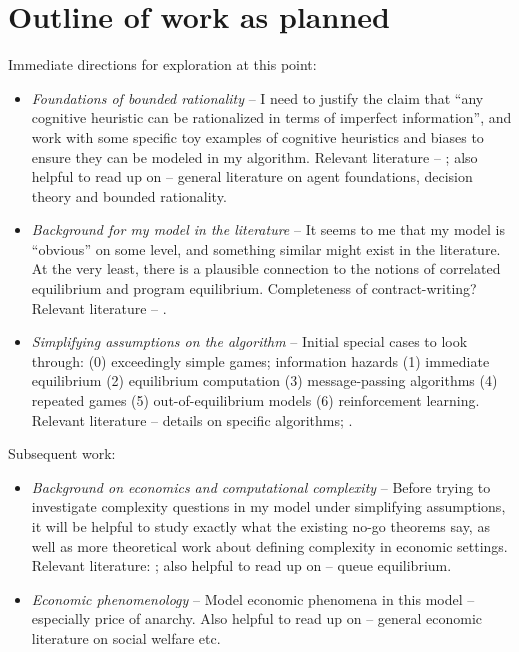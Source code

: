 \documentclass{article}
\begin{document}
\section{Outline of work as planned}
\label{sec:outline}

Immediate directions for exploration at this point:
\begin{itemize}
    \item \emph{Foundations of bounded rationality} -- I need to justify the claim that ``any cognitive heuristic can be rationalized in terms of imperfect information'', and work with some specific toy examples of cognitive heuristics and biases to ensure they can be modeled in my algorithm. Relevant literature -- \cite{br1, br2}; also helpful to read up on -- general literature on agent foundations, decision theory and bounded rationality.
    \item \emph{Background for my model in the literature} -- It seems to me that my model is ``obvious'' on some level, and something similar might exist in the literature. At the very least, there is a plausible connection to the notions of correlated equilibrium and program equilibrium. Completeness of contract-writing? Relevant literature -- \cite{aumann, marks, progeq}.
    \item \emph{Simplifying assumptions on the algorithm} -- Initial special cases to look through: (0) exceedingly simple games; information hazards (1) immediate equilibrium (2) equilibrium computation (3) message-passing algorithms (4) repeated games (5) out-of-equilibrium models (6) reinforcement learning. Relevant literature -- details on specific algorithms; \cite{gode, tesfatsion}.
\end{itemize}
Subsequent work:
\begin{itemize}
    \item \emph{Background on economics and computational complexity} -- Before trying to investigate complexity questions in my model under simplifying assumptions, it will be helpful to study exactly what the existing no-go theorems say, as well as more theoretical work about defining complexity in economic settings. Relevant literature: \cite{echenique, chenthesis, norman} \cite{agt:2, goapprox, maymin}; also helpful to read up on -- queue equilibrium.
    \item \emph{Economic phenomenology} -- Model economic phenomena in this model -- especially price of anarchy. Also helpful to read up on -- general economic literature on social welfare etc.
\end{itemize}

\printbibliography
\end{document}
